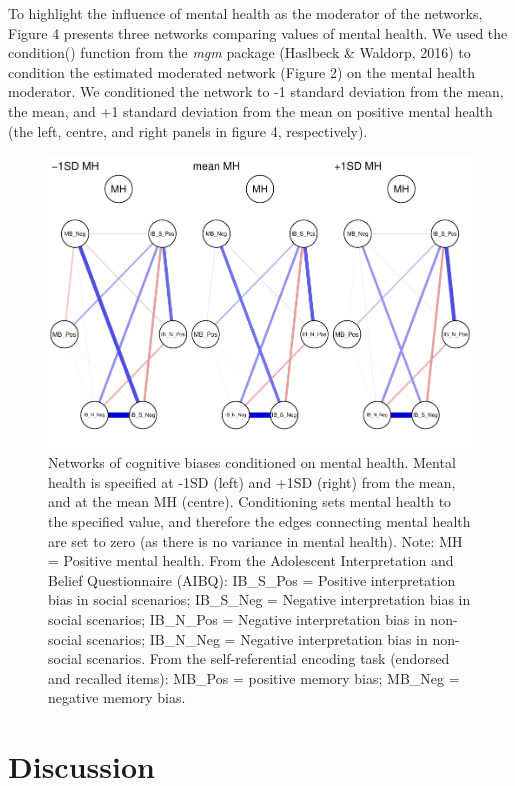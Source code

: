 \documentclass[man,floatsintext]{apa6}
\begin{document}
To highlight the influence of mental health as the moderator of the networks, Figure 4 presents three networks comparing values of mental health. We used the condition() function from the \emph{mgm} package (Haslbeck \& Waldorp, 2016) to condition the estimated moderated network (Figure 2) on the mental health moderator. We conditioned the network to -1 standard deviation from the mean, the mean, and +1 standard deviation from the mean on positive mental health (the left, centre, and right panels in figure 4, respectively).

\begin{figure}
\centering
\includegraphics{CCBH-in-adolescence---Network-analysis_files/figure-latex/unnamed-chunk-5-1.pdf}
\caption{\label{fig:unnamed-chunk-5}Networks of cognitive biases conditioned on mental health. Mental health is specified at -1SD (left) and +1SD (right) from the mean, and at the mean MH (centre). Conditioning sets mental health to the specified value, and therefore the edges connecting mental health are set to zero (as there is no variance in mental health).
Note: MH = Positive mental health. From the Adolescent Interpretation and Belief Questionnaire (AIBQ): IB\_S\_Pos = Positive interpretation bias in social scenarios; IB\_S\_Neg = Negative interpretation bias in social scenarios; IB\_N\_Pos = Negative interpretation bias in non-social scenarios; IB\_N\_Neg = Negative interpretation bias in non-social scenarios. From the self-referential encoding task (endorsed and recalled items): MB\_Pos = positive memory bias; MB\_Neg = negative memory bias.}
\end{figure}

\hypertarget{discussion}{%
\section{Discussion}\label{discussion}}
\end{document}

